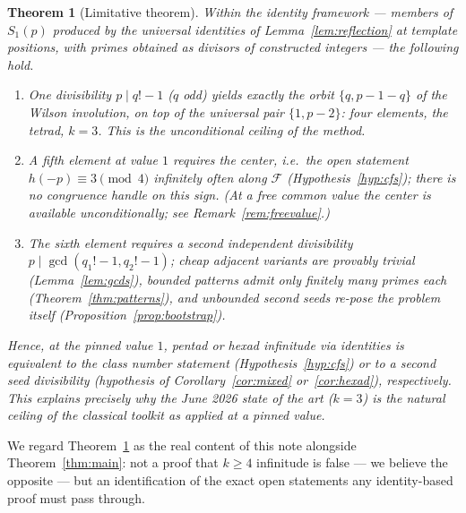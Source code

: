 \documentclass[11pt]{article}
\newtheorem{theorem}{Theorem}[section]
\theoremstyle{definition}
\theoremstyle{remark}
\begin{document}
\begin{theorem}[Limitative theorem]\label{thm:limitative}
Within the identity framework --- members of $S_1(p)$ produced by the
universal identities of Lemma~\ref{lem:reflection} at template positions,
with primes obtained as divisors of constructed integers --- the following
hold.
\begin{enumerate}
  \item[(i)] One divisibility $p \mid q!-1$ ($q$ odd) yields exactly the
    orbit $\{q, p-1-q\}$ of the Wilson involution, on top of the universal
    pair $\{1, p-2\}$: four elements, the tetrad, $k = 3$. This is the
    unconditional ceiling of the method.
  \item[(ii)] A fifth element \emph{at value $1$} requires the center, i.e.\
    the open statement $h(-p) \equiv 3 \pmod 4$ infinitely often along
    $\mathcal F$ (Hypothesis~\ref{hyp:cfs}); there is no congruence
    handle on this sign. (At a free common value the center is available
    unconditionally; see Remark~\ref{rem:freevalue}.)
  \item[(iii)] The sixth element requires a second independent divisibility
    $p \mid \gcd(q_1!-1, q_2!-1)$; cheap adjacent variants are provably
    trivial (Lemma~\ref{lem:gcds}), bounded patterns admit only finitely
    many primes each (Theorem~\ref{thm:patterns}), and unbounded second
    seeds re-pose the problem itself (Proposition~\ref{prop:bootstrap}).
\end{enumerate}
Hence, \emph{at the pinned value $1$}, pentad or hexad infinitude via
identities is \emph{equivalent} to the class number statement
(Hypothesis~\ref{hyp:cfs}) or to a second seed divisibility (hypothesis of
Corollary~\ref{cor:mixed} or~\ref{cor:hexad}), respectively. This explains
precisely why the June 2026 state of the art ($k = 3$) is the natural
ceiling of the classical toolkit \emph{as applied at a pinned value}.
\end{theorem}

We regard Theorem~\ref{thm:limitative} as the real content of this note
alongside Theorem~\ref{thm:main}: not a proof that $k \ge 4$ infinitude is
false --- we believe the opposite --- but an identification of the exact
open statements any identity-based proof must pass through.
\end{document}

